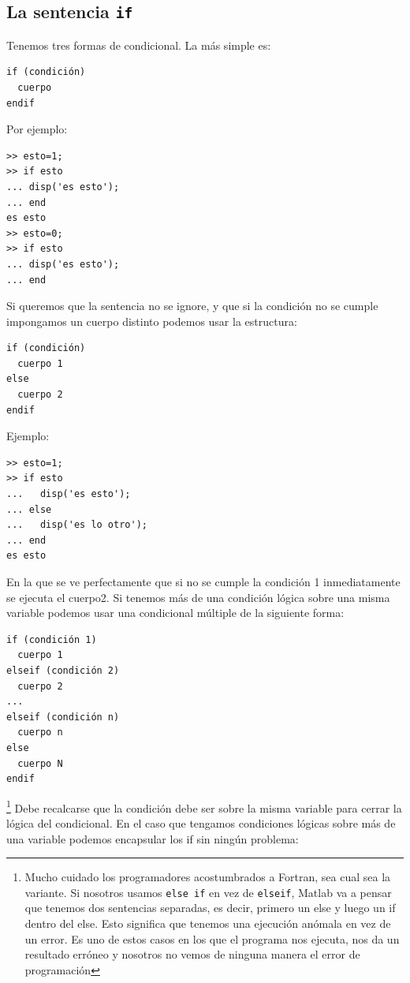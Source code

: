 \subsection{La sentencia \texttt{if}}

Tenemos tres formas de condicional. La más simple es:

\begin{verbatim}
if (condición)
  cuerpo
endif
\end{verbatim}
Por ejemplo:
\begin{verbatim}
>> esto=1;
>> if esto
... disp('es esto');
... end
es esto
>> esto=0;
>> if esto
... disp('es esto');
... end
\end{verbatim}

Si queremos que la sentencia no se ignore, y que si la condición no se
cumple impongamos un cuerpo distinto podemos usar la estructura:

\begin{verbatim}
if (condición)   
  cuerpo 1   
else    
  cuerpo 2   
endif
\end{verbatim}
Ejemplo:
\begin{verbatim}
>> esto=1;
>> if esto
...   disp('es esto');
... else
...   disp('es lo otro');
... end
es esto
\end{verbatim}

En la que se ve perfectamente que si no se cumple la condición 1
inmediatamente se ejecuta el cuerpo2. Si tenemos más de una condición
lógica sobre una misma variable podemos usar una condicional múltiple
de la siguiente forma:

\begin{verbatim}
if (condición 1)   
  cuerpo 1   
elseif (condición 2)   
  cuerpo 2   
...   
elseif (condición n)   
  cuerpo n   
else   
  cuerpo N   
endif
\end{verbatim}

\footnote{Mucho cuidado los programadores acostumbrados a Fortran, sea
  cual sea la variante.  Si nosotros usamos \texttt{else if} en vez de
  \texttt{elseif}, Matlab va a pensar que tenemos dos sentencias
  separadas, es decir, primero un else y luego un if dentro del else.
  Esto significa que tenemos una ejecución anómala en vez de un error.
  Es uno de estos casos en los que el programa nos ejecuta, nos da un
  resultado erróneo y nosotros no vemos de ninguna manera el error de
  programación%
} Debe recalcarse que la condición debe ser sobre la misma variable
para cerrar la lógica del condicional. En el caso que tengamos
condiciones lógicas sobre más de una variable podemos encapsular los
if sin ningún problema:

